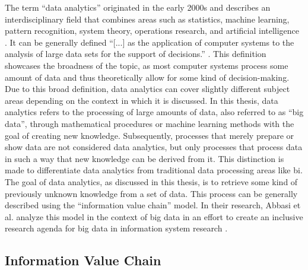 The term \enquote{data analytics} originated in the early 2000s and describes an interdisciplinary field that combines areas such as statistics, machine learning, pattern recognition, system theory, operations research, and artificial intelligence \parencite{Runkler.2020}. It can be generally defined \enquote{[...] as the application of computer systems to the analysis of large data sets for the support of decisions.} \parencite{Runkler.2020}. This definition showcases the broadness of the topic, as most computer systems process some amount of data and thus theoretically allow for some kind of decision-making. Due to this broad definition, data analytics can cover slightly different subject areas depending on the context in which it is discussed. In this thesis, data analytics refers to the processing of large amounts of data, also referred to as \enquote{big data}, through mathematical procedures or machine learning methods with the goal of creating new knowledge. Subsequently, processes that merely prepare or show data are not considered data analytics, but only processes that process data in such a way that new knowledge can be derived from it. This distinction is made to differentiate data analytics from traditional data processing areas like \ac{bi}. The goal of data analytics, as discussed in this thesis, is to retrieve some kind of previously unknown knowledge from a set of data. This process can be generally described using the \enquote{information value chain} model. In their research, Abbasi et al. analyze this model in the context of big data in an effort to create an inclusive research agenda for big data in information system research \parencite{Abbasi.2016}.

\subsection{Information Value Chain}
\label{subsec:informationValueChainSubSection}

